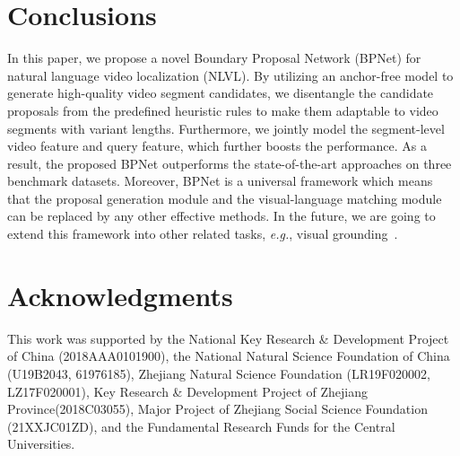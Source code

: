 \documentclass[letterpaper]{article} %
\newcommand{\eg}{\emph{e.g.}}
\begin{document}
\section{Conclusions}
In this paper, we propose a novel Boundary Proposal Network (BPNet) 
for natural language video localization (NLVL). 
By utilizing an anchor-free model to generate high-quality video segment 
candidates, 
we disentangle the candidate proposals from the predefined heuristic rules 
to make them adaptable to video segments with variant lengths. 
Furthermore, we jointly model the segment-level video feature and query feature, 
which further boosts the performance. 
As a result, the proposed BPNet outperforms the state-of-the-art approaches 
on three benchmark datasets. 
Moreover, BPNet is a universal framework which means that the proposal 
generation module and the visual-language matching module can be replaced by any 
other effective methods. In the future, we are going to extend this framework into other related tasks, \eg, visual grounding~\cite{chen2021ref}.

\section*{Acknowledgments} 
This work was supported by the National Key Research \& Development Project of China (2018AAA0101900), the National Natural Science Foundation of China (U19B2043, 61976185), Zhejiang Natural Science Foundation (LR19F020002, LZ17F020001), Key Research \& Development Project of Zhejiang Province(2018C03055), Major Project of Zhejiang Social Science Foundation (21XXJC01ZD), and the Fundamental Research Funds for the Central Universities.


\end{document}
